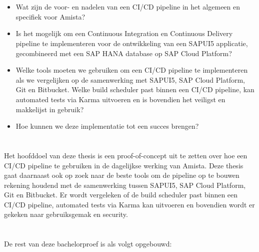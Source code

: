 \section{}
\label{sec:onderzoeksvraag}
\begin{itemize}
    \item Wat zijn de voor- en nadelen van een CI/CD pipeline in het algemeen en specifiek voor Amista?
    \item Is het mogelijk om een Continuous Integration en Continuous Delivery pipeline te implementeren voor de ontwikkeling van een SAPUI5 applicatie, gecombineerd met een SAP HANA database op SAP Cloud Platform?
    \item Welke tools moeten we gebruiken om een CI/CD pipeline te implementeren als we vergelijken op de samenwerking met SAPUI5, SAP Cloud Platform, Git en Bitbucket. Welke build scheduler past binnen een CI/CD pipeline, kan automated tests via Karma uitvoeren en is bovendien het veiligst en makkelijst in gebruik?
    \item Hoe kunnen we deze implementatie tot een succes brengen?
    
\end{itemize}

\section{}
\label{sec:onderzoeksdoelstelling}
Het hoofddoel van deze thesis is een proof-of-concept uit te zetten over hoe een CI/CD pipeline te gebruiken in de dagelijkse werking van Amista.
Deze thesis gaat daarnaast ook op zoek naar de beste tools om de pipeline op te bouwen rekening houdend met de samenwerking tussen SAPUI5, SAP Cloud Platform, Git en Bitbucket. Er wordt vergeleken of de build scheduler past binnen een CI/CD pipeline, automated tests via Karma kan uitvoeren en bovendien wordt er gekeken naar gebruiksgemak en security.

\section{}
\label{sec:opzet-bachelorproef}
De rest van deze bachelorproef is als volgt opgebouwd:

